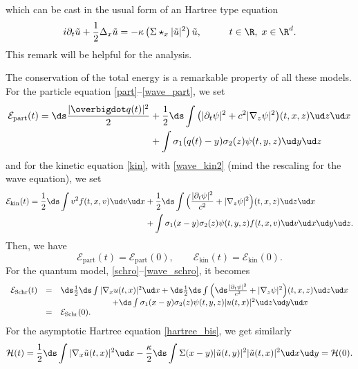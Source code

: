 which can be cast in the usual form of an Hartree type equation
\begin{equation}\label{hartree_bis}
i\partial_{t}\tilde u+\frac{1}{2}\Delta_{x}\tilde u=-\kappa\left(\Sigma\star_{x}|\tilde u|^{2}\right)\tilde u,\hspace{1cm}t\in\R,\;x\in\R^{d}.
\end{equation}
This remark will be helpful for the analysis.

The conservation of the total
energy
is a remarkable property of all these models.
For the particle equation \eqref{part}--\eqref{wave_part}, we set
\begin{align*}
\mathcal E_{\mathrm{part}}(t)=\ds\frac{|\overbigdot q(t)|^2}{2} &+\frac12\ds\int \big(
|\partial_t \psi | ^ 2+ c^2 |\nabla_z \psi|^2\big) (t,x,z) \ud z\ud x
\\
&+\int \sigma_1( q(t)-y)\sigma_2(z)\psi(t,y,z)\ud y \ud z
\end{align*}
and for the kinetic equation \eqref{kin}, with \eqref{wave_kin2}
(mind the rescaling for the wave equation), we set
\begin{align*}
\mathcal E_{\mathrm{kin}}(t)
=\frac{1}{2} \ds\int v^2 f(t,x,v)\ud v \ud x&+\frac{1}{2}\ds\int \Big(\frac{|\partial_t \psi | ^ 2}{c^2}+ |\nabla_z \psi|^2\Big) (t,x,z) \ud z\ud x
\\
&+\int \sigma_1( x-y)\sigma_2(z)\psi(t,y,z)f(t,x,v) \ud v \ud x \ud y \ud z.
\end{align*}
Then, we have
\[
\mathcal E_{\mathrm{part}}(t)=\mathcal E_{\mathrm{part}}(0),\qquad
\mathcal E_{\mathrm{kin}}(t)=\mathcal E_{\mathrm{kin}}(0).
\]
For the quantum model, \eqref{schro}--\eqref{wave_schro}, it becomes
\begin{equation}\label{energy_Sch}
\begin{array}{lll}
\mathcal E_{\mathrm {Schr}}(t)&=&
\ds\frac{1}{2}
\ds\int |\nabla_{x}u(t,x)|^2 \ud x+
\ds\frac{1}{2}\ds\int \Big(
\ds\frac{|\partial_t \psi | ^ 2}{c^2}+ |\nabla_z \psi|^2\Big) (t,x,z) \ud z\ud x
\\&&\hspace*{2.2cm} +
\ds \int
\sigma_{1} (x-y) \sigma_{2}(z)\psi(t,y,z) |u(t,x) |^{2}\ud z\ud y\ud x
\\&=&\mathcal E_{\mathrm {Schr}}(0).
\end{array}
\end{equation}
For
the asymptotic Hartree equation \eqref{hartree_bis}, we get
similarly
\begin{equation}\label{energy_Har}
\mathcal H(t)=\frac{1}{2}\ds\int |\nabla_{x}\tilde u(t,x)|^2 \ud x
-\frac{\kappa}{2}\ds\int \Sigma(x-y) |\tilde u(t,y) |^{2}|\tilde u(t,x) |^{2}\ud x\ud y
=\mathcal H(0).
\end{equation}
